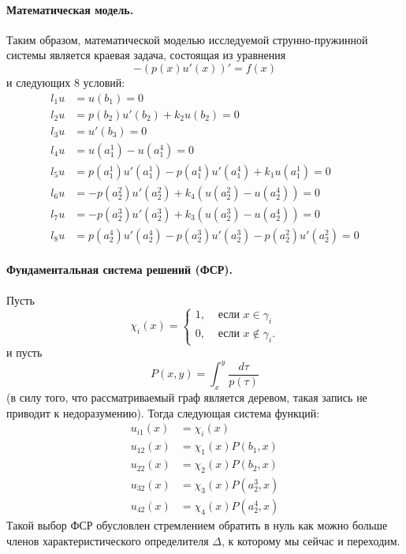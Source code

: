\documentclass[a4paper,12pt]{article} %
\begin{document}
\paragraph{Математическая модель.}
Таким образом, математической моделью исследуемой струнно-пружинной системы является
краевая задача, состоящая из уравнения
\begin{equation}
	-(p(x)u'(x))' = f(x)
\end{equation}
и следующих 8 условий:
\begin{align}
	l_1 u & = u(b_1) = 0
	\\
	l_2 u & = p(b_2  ) u'(b_2  ) + k_2  u(b_2  ) = 0
	\\
	l_3 u & = u'(b_3) = 0
	\\
	l_4 u & = u(a_1^1) - u(a_1^4) = 0
	\\
	l_5 u & = p(a_1^1) u'(a_1^1) - p(a_1^4) u'(a_1^4) + k_1  u(a_1^1) = 0
	\\
	l_6 u & = - p(a_2^2) u'(a_2^2) + k_4 (u(a_2^2) - u(a_2^4)) = 0
	\\
	l_7 u & = - p(a_2^3) u'(a_2^3) + k_3 (u(a_2^3) - u(a_2^4)) = 0
	\\
	l_8 u & = p(a_2^4) u'(a_2^4) - p(a_2^3) u'(a_2^3) - p(a_2^2) u'(a_2^2) = 0
\end{align}

\paragraph{Фундаментальная система решений (ФСР).}
Пусть
\begin{equation}
	\chi_{i}(x) = \begin{cases}
		1, & \mbox{~если~} x \in \gamma_i
		\\
		0, & \mbox{~если~} x \notin \gamma_i.
	\end{cases}
\end{equation}
и пусть
\begin{equation}
	P(x,y) = \int_x^y \frac{d\tau}{p(\tau)}
\end{equation}
(в силу того, что рассматриваемый граф является деревом, такая запись не приводит к недоразумению).
Тогда следующая система функций:
\begin{align}
	u_{i1}(x) & = \chi_i(x)
	\\
	u_{12}(x) & = \chi_1(x) P(b_1  , x)
	\\
	u_{22}(x) & = \chi_2(x) P(b_2  , x)
	\\
	u_{32}(x) & = \chi_3(x) P(a_2^3, x)
	\\
	u_{42}(x) & = \chi_4(x) P(a_2^4, x)
\end{align}
Такой выбор ФСР обусловлен стремлением обратить в нуль
как можно больше членов характеристического определителя $\Delta$,
к которому мы сейчас и переходим.
\end{document}
